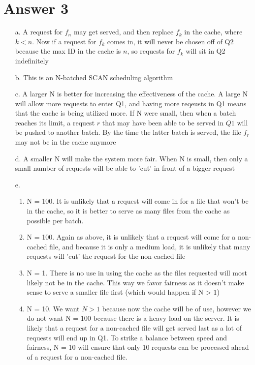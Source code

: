 \documentclass[11pt]{article}
\theoremstyle{definition}
\begin{document}
\section*{Answer 3}
\begin{enumerate}
	\item[a.] A request for $f_n$ may get served, and then replace $f_k$ in the cache, where $k < n$.  Now if a request for $f_k$ comes in, it will never be chosen off of Q2
	because the max ID in the cache is $n$, so requests for $f_k$ will sit in Q2 indefinitely
	
	\item[b.] This is an N-batched SCAN scheduling algorithm
	
	\item[c.] A larger N is better for increasing the effectiveness of the cache.  A large N will allow more requests to enter Q1, and having more reqeusts in Q1 means that the cache
	is being utilized more.  If N were small, then when a batch reaches its limit, a request $r$ that may have been able to be served in $Q1$ will be pushed to another batch.  By the time the latter
	batch is served, the file $f_r$ may not be in the cache anymore
	
	\item[d.] A smaller N will make the system more fair.  When N is small, then only a small number of requests will be able to 'cut' in front of a bigger request
	
	\item[e.] 
		\begin{enumerate}
		\item N = 100.  It is unlikely that a request will come in for a file that won't be in the cache, so it is better to serve as many files from the cache as possible per batch.
		\item N = 100.  Again as above, it is unlikely that a request will come for a non-cached file, and because it is only a medium load, it is unlikely that many requests will 'cut' the request for the
		non-cached file
		\item N = 1. There is no use in using the cache as the files requested will most likely not be in the cache. This way we favor fairness as it doesn't make sense to serve a smaller file first (which would happen if N > 1)
		\item N = 10. We want $N > 1$ because now the cache will be of use, however we do not want N = 100 because there is a heavy load on the server.  It is likely that a request for a non-cached file will get served last as a lot
		of requests will end up in Q1.  To strike a balance between speed and fairness, N = 10 will ensure that only 10 requests can be processed ahead of a request for a non-cached file.
		\end{enumerate}
\end{enumerate}
\end{document}
